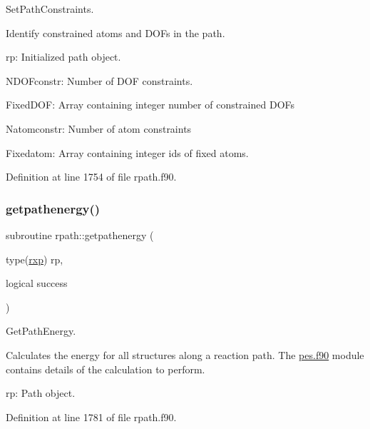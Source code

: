 Set\+Path\+Constraints. 

Identify constrained atoms and D\+O\+Fs in the path.


\begin{DoxyItemize}
\item rp\+: Initialized path object.
\item N\+D\+O\+Fconstr\+: Number of D\+OF constraints.
\item Fixed\+D\+OF\+: Array containing integer number of constrained D\+O\+Fs
\item Natomconstr\+: Number of atom constraints
\item Fixedatom\+: Array containing integer ids of fixed atoms. 
\end{DoxyItemize}

Definition at line 1754 of file rpath.\+f90.

\mbox{\label{namespacerpath_ac8b51bb543056270fc034d75ba2a7266}} 
\subsubsection{\texorpdfstring{getpathenergy()}{getpathenergy()}}
{\footnotesize\ttfamily subroutine rpath\+::getpathenergy (\begin{DoxyParamCaption}\item[{type(\mbox{\hyperlink{structrpath_1_1rxp}{rxp}})}]{rp,  }\item[{logical}]{success }\end{DoxyParamCaption})}



Get\+Path\+Energy. 

Calculates the energy for all structures along a reaction path. The \mbox{\hyperlink{pes_8f90_source}{pes.\+f90}} module contains details of the calculation to perform.


\begin{DoxyItemize}
\item rp\+: Path object. 
\end{DoxyItemize}

Definition at line 1781 of file rpath.\+f90.

\mbox{\label{namespacerpath_a1faa43d82cebd49dbfb23e87189db2c2}} 
